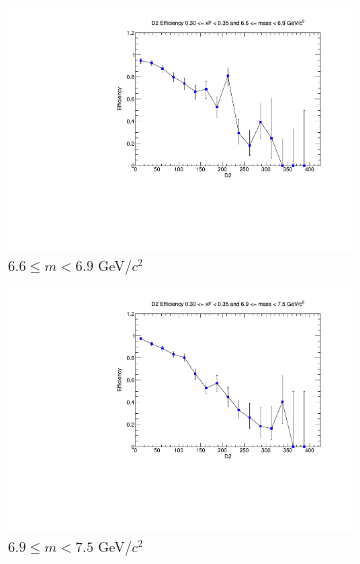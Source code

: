 \documentclass[11pt]{article}
\begin{document}
\begin{figure}[p]
\begin{subfigure}[b]{0.32\textwidth}
        \includegraphics[width=\textwidth]{./kTrackerEfficiencyPlots/D2_Efficiency_xF6_mass8.pdf}
        \caption{$6.6 \leq m < 6.9$ GeV/$c^2$}
    \end{subfigure}\vspace{0.5cm}
    \begin{subfigure}[b]{0.32\textwidth}
        \centering
        \includegraphics[width=\textwidth]{./kTrackerEfficiencyPlots/D2_Efficiency_xF6_mass9.pdf}
        \caption{$6.9 \leq m < 7.5$ GeV/$c^2$}
    \end{subfigure}\hfill
    \begin{subfigure}[b]{0.32\textwidth}
        \centering

\end{subfigure}
\end{figure}
\end{document}

